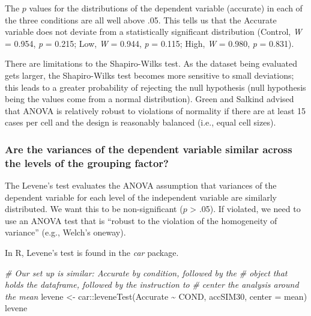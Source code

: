 \documentclass[
  11pt,
]{book}
\newenvironment{Shaded}{\begin{snugshade}}{\end{snugshade}}
\newcommand{\AttributeTok}[1]{\textcolor[rgb]{0.77,0.63,0.00}{#1}}
\newcommand{\CommentTok}[1]{\textcolor[rgb]{0.56,0.35,0.01}{\textit{#1}}}
\newcommand{\FunctionTok}[1]{\textcolor[rgb]{0.00,0.00,0.00}{#1}}
\newcommand{\NormalTok}[1]{#1}
\newcommand{\OtherTok}[1]{\textcolor[rgb]{0.56,0.35,0.01}{#1}}
\newcommand{\SpecialCharTok}[1]{\textcolor[rgb]{0.00,0.00,0.00}{#1}}
\begin{document}
The \(p\) values for the distributions of the dependent variable (accurate) in each of the three conditions are all well above .05. This tells us that the Accurate variable does not deviate from a statistically significant distribution (Control, \emph{W} = 0.954, \emph{p} = 0.215; Low, \emph{W} = 0.944, \emph{p} = 0.115; High, \emph{W} = 0.980, \emph{p} = 0.831).

There are limitations to the Shapiro-Wilks test. As the dataset being evaluated gets larger, the Shapiro-Wilks test becomes more sensitive to small deviations; this leads to a greater probability of rejecting the null hypothesis (null hypothesis being the values come from a normal distribution). Green and Salkind \citeyearpar{green_using_2014} advised that ANOVA is relatively robust to violations of normality if there are at least 15 cases per cell and the design is reasonably balanced (i.e., equal cell sizes).

\hypertarget{are-the-variances-of-the-dependent-variable-similar-across-the-levels-of-the-grouping-factor}{%
\subsubsection{Are the variances of the dependent variable similar across the levels of the grouping factor?}\label{are-the-variances-of-the-dependent-variable-similar-across-the-levels-of-the-grouping-factor}}

The Levene's test evaluates the ANOVA assumption that variances of the dependent variable for each level of the independent variable are similarly distributed. We want this to be non-significant (\(p\) \textgreater{} .05). If violated, we need to use an ANOVA test that is ``robust to the violation of the homogeneity of variance'' (e.g., Welch's oneway).

In R, Levene's test is found in the \emph{car} package.

\begin{Shaded}
\begin{Highlighting}[]
\CommentTok{\# Our set up is similar: Accurate by condition, followed by the}
\CommentTok{\# object that holds the dataframe, followed by the instruction to}
\CommentTok{\# center the analysis around the mean}
\NormalTok{levene }\OtherTok{\textless{}{-}}\NormalTok{ car}\SpecialCharTok{::}\FunctionTok{leveneTest}\NormalTok{(Accurate }\SpecialCharTok{\textasciitilde{}}\NormalTok{ COND, accSIM30, }\AttributeTok{center =}\NormalTok{ mean)}
\NormalTok{levene}
\end{Highlighting}
\end{Shaded}
\end{document}

